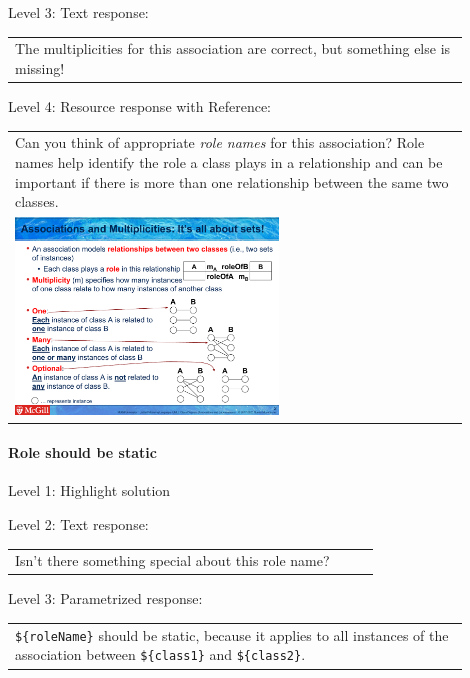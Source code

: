 \noindent Level 3: Text response: \medskip

\begin{tabular}{|p{0.9\linewidth}}
The multiplicities for this association are correct, but something else is missing!
\end{tabular} \medskip

\noindent Level 4: Resource response with Reference: \medskip

\begin{tabular}{|p{0.9\linewidth}}
Can you think of appropriate \textit{role names}
for this association? Role names help identify the role a class plays in a
relationship and can be important if there is more than one relationship
between the same two classes.

\\
\includegraphics[width=0.6\textwidth]{images/role_name.png}

\end{tabular} \medskip


\paragraph{Role should be static}

\noindent Level 1: Highlight solution \medskip

\noindent Level 2: Text response: \medskip

\begin{tabular}{|p{0.9\linewidth}}
Isn't there something special about this role name?
\end{tabular} \medskip

\noindent Level 3: Parametrized response: \medskip

\begin{tabular}{|p{0.9\linewidth}}
\verb|${roleName}| should be static, because it applies to all instances of the association between \verb|${class1}| and \verb|${class2}|.
\end{tabular} \medskip

